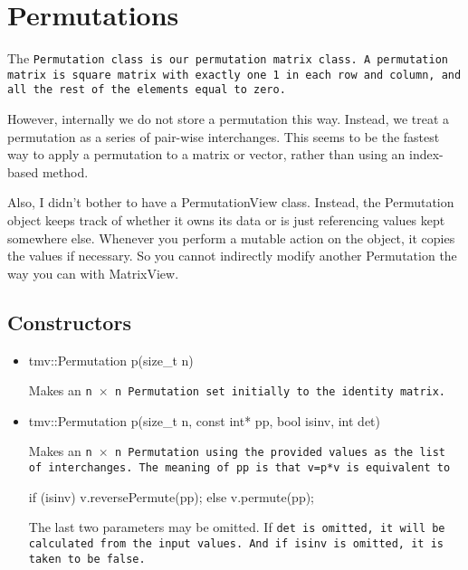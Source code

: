 
\section{Permutations}
\label{Permutation}

The \tt{Permutation} class is our permutation matrix class.
A permutation matrix is square matrix with exactly one 1 in each row and
column, and all the rest of the elements equal to zero.

However, internally we do not store a permutation this way.
Instead, we treat a permutation as a series of pair-wise interchanges.
This seems to be the fastest way to apply a permutation to a matrix or
vector, rather than using an index-based method.

Also, I didn't bother to have a PermutationView class.  Instead, the 
Permutation object keeps track of whether it owns its data or is just
referencing values kept somewhere else.  Whenever you perform 
a mutable action on the object, it copies the values if necessary.
So you cannot indirectly modify another Permutation the way you can
with MatrixView.

\subsection{Constructors}
\label{Permutation_Constructors}

\begin{itemize}
\item 
\begin{tmvcode}
tmv::Permutation p(size_t n)
\end{tmvcode}
Makes an \tt{n} $\times$ \tt{n} \tt{Permutation} set initially to the identity matrix.

\item
\begin{tmvcode}
tmv::Permutation p(size_t n, const int* pp, bool isinv, int det)
\end{tmvcode}
Makes an \tt{n} $\times$ \tt{n} \tt{Permutation} using the provided values as the 
list of interchanges.  The meaning of pp is that \tt{v=p*v} is equivalent to
\begin{tmvcode}
if (isinv) v.reversePermute(pp);
else v.permute(pp);
\end{tmvcode}
The last two parameters may be omitted.  If \tt{det} is omitted, it will be calculated
from the input values.  And if \tt{isinv} is omitted, it is taken to be \tt{false}.

\end{itemize}


